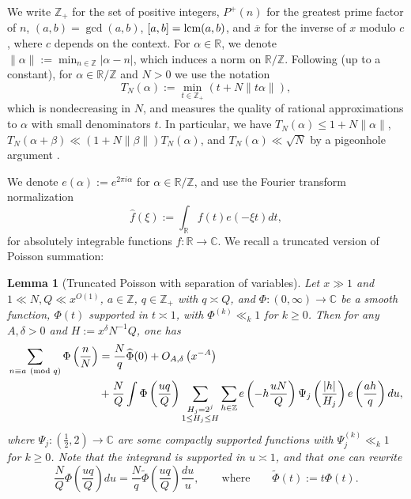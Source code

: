\documentclass[reqno,11pt]{amsart}
\newtheorem{lemma}[theorem]{Lemma}
\theoremstyle{remark}
\numberwithin{equation}{section}
\newcommand{\Z}{\mathbb{Z}}
\newcommand{\R}{\mathbb{R}}
\newcommand{\C}{\mathbb{C}}
\renewcommand{\bar}{\overline}
\renewcommand{\hat}{\widehat}
\renewcommand{\tilde}{\widetilde}
\renewcommand{\pmod}[1]{\ (\textnormal{mod } #1)}
\newcommand{\lcm}{\textnormal{lcm}}
\begin{document}
We write $\Z_+$ for the set of positive integers, $P^+(n)$ for the greatest prime factor of $n$, $(a, b) = \gcd(a, b)$, $[a, b] = \lcm(a, b)$, and $\bar{x}$ for the inverse of $x$ modulo $c$, where $c$ depends on the context. For $\alpha \in \R$, we denote $\|\alpha\| := \min_{n \in \Z} |\alpha - n|$, which induces a norm on $\R/\Z$. Following \cite[Notation 5]{pascadi2024large} (up to a constant), for $\alpha \in \R/\Z$ and $N > 0$ we use the notation
\begin{equation} \label{eq:tn}
    T_N(\alpha) := \min_{t \in \Z_+} \left(t + N\|t\alpha\|\right),
\end{equation}
which is nondecreasing in $N$, and measures the quality of rational approximations to $\alpha$ with small denominators $t$. In particular, we have $T_N(\alpha) \le 1 + N\|\alpha\|$, $T_N(\alpha+\beta) \ll (1 + N\|\beta\|)T_N(\alpha)$, and $T_N(\alpha) \ll \sqrt{N}$ by a pigeonhole argument \cite[Lemma 7]{pascadi2024large}.

We denote $e(\alpha) := e^{2\pi i \alpha}$ for $\alpha \in \R/\Z$, and use the Fourier transform normalization
\[
    \hat{f}(\xi) := \int_\R f(t) e(-\xi t) dt,
\]
for absolutely integrable functions $f : \R \to \C$. We recall a truncated version of Poisson summation:

\begin{lemma}[Truncated Poisson with separation of variables] \label{lem:truncated-poisson}
Let $x \gg 1$ and $1 \ll N, Q \ll x^{O(1)}$, $a \in \Z$, $q \in \Z_+$ with $q \asymp Q$, and $\Phi : (0, \infty) \to \C$ be a smooth function, $\Phi(t)$ supported in $t \asymp 1$, with $\Phi^{(k)} \ll_k 1$ for $k \ge 0$. Then for any $A, \delta > 0$ and $H := x^\delta N^{-1} Q$, one has
\[
\begin{aligned}
    \sum_{n \equiv a \pmod{q}} \Phi\left(\frac{n}{N}\right)
    &=
    \frac{N}{q} \hat{\Phi}(0)
    +
    O_{A,\delta}\left(x^{-A}\right)
    \\
    &+
    \frac{N}{Q} \int \Phi\left(\frac{uq}{Q}\right) \sum_{\substack{H_j = 2^j \\ 1 \le H_j \le H}}
    \sum_{h \in \Z} e\left(- h\frac{uN}{Q}\right) 
     \Psi_j\left(\frac{|h|}{H_j}\right) e\left( \frac{ah}{q} \right) du,
\end{aligned}
\]
where $\Psi_j : (\frac{1}{2}, 2) \to \C$ are some compactly supported functions with $\Psi_j^{(k)} \ll_k 1$ for $k \ge 0$. Note that the integrand is supported in $u \asymp 1$, and that one can rewrite
\[
    \frac{N}{Q} \Phi\left(\frac{uq}{Q}\right) du = \frac{N}{q} \tilde\Phi\left(\frac{uq}{Q}\right) \frac{du}{u}, \qquad \text{where} \qquad \tilde\Phi(t) := t\Phi(t).
\]
\end{lemma}
\end{document}
